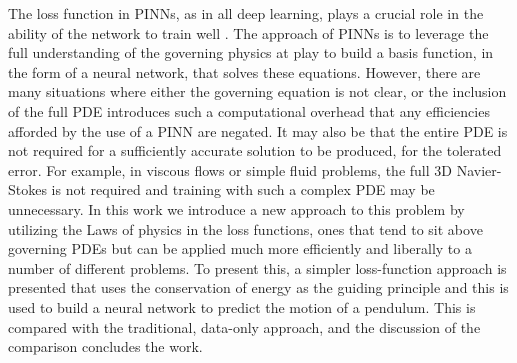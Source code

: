 \documentclass[3p]{elsarticle}
\begin{document}
The loss function in PINNs, as in all deep learning, plays a crucial role in the ability of the network to train well \cite{Johnson2016694}. The approach of PINNs is to leverage the full understanding of the governing physics at play to build a basis function, in the form of a neural network, that solves these equations. However, there are many situations where either the governing equation is not clear, or the inclusion of the full PDE introduces such a computational overhead that any efficiencies afforded by the use of a PINN are negated. It may also be that the entire PDE is not required for a sufficiently accurate solution to be produced, for the tolerated error. For example, in viscous flows or simple fluid problems, the full 3D Navier-Stokes is not required and training with such a complex PDE may be unnecessary. In this work we introduce a new approach to this problem by utilizing the Laws of physics in the loss functions, ones that tend to sit above governing PDEs but can be applied much more efficiently and liberally to a number of different problems. To present this, a simpler loss-function approach is presented that uses the conservation of energy as the guiding principle and this is used to build a neural network to predict the motion of a pendulum. This is compared with the traditional, data-only approach, and the discussion of the comparison concludes the work.
\end{document}

